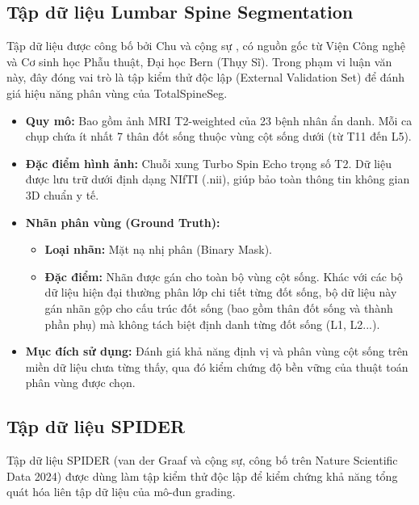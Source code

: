 \subsection{Tập dữ liệu Lumbar Spine Segmentation \cite{chu2015dataset}}
Tập dữ liệu được công bố bởi Chu và cộng sự \cite{chu2015dataset}, có nguồn gốc từ Viện Công nghệ và Cơ sinh học Phẫu thuật, Đại học Bern (Thụy Sĩ). Trong phạm vi luận văn này, đây đóng vai trò là tập kiểm thử độc lập (External Validation Set) để đánh giá hiệu năng phân vùng của TotalSpineSeg.

\begin{itemize}
    \item \textbf{Quy mô:} Bao gồm ảnh MRI T2-weighted của 23 bệnh nhân ẩn danh. Mỗi ca chụp chứa ít nhất 7 thân đốt sống thuộc vùng cột sống dưới (từ T11 đến L5).
    \item \textbf{Đặc điểm hình ảnh:} Chuỗi xung Turbo Spin Echo trọng số T2. Dữ liệu được lưu trữ dưới định dạng NIfTI (.nii), giúp bảo toàn thông tin không gian 3D chuẩn y tế.
    \item \textbf{Nhãn phân vùng (Ground Truth):}
        \begin{itemize}
            \item[$\circ$] \textbf{Loại nhãn:} Mặt nạ nhị phân (Binary Mask).
            \item[$\circ$] \textbf{Đặc điểm:} Nhãn được gán cho toàn bộ vùng cột sống. Khác với các bộ dữ liệu hiện đại thường phân lớp chi tiết từng đốt sống, bộ dữ liệu này gán nhãn gộp cho cấu trúc đốt sống (bao gồm thân đốt sống và thành phần phụ) mà không tách biệt định danh từng đốt sống (L1, L2...).
        \end{itemize}
    \item \textbf{Mục đích sử dụng:} Đánh giá khả năng định vị và phân vùng cột sống trên miền dữ liệu chưa từng thấy, qua đó kiểm chứng độ bền vững của thuật toán phân vùng được chọn.
\end{itemize}

\subsection{Tập dữ liệu SPIDER \cite{vansluijs2022spider}}
Tập dữ liệu SPIDER (van der Graaf và cộng sự, công bố trên Nature Scientific Data 2024) được dùng làm tập kiểm thử độc lập để kiểm chứng khả năng tổng quát hóa liên tập dữ liệu của mô-đun grading.

